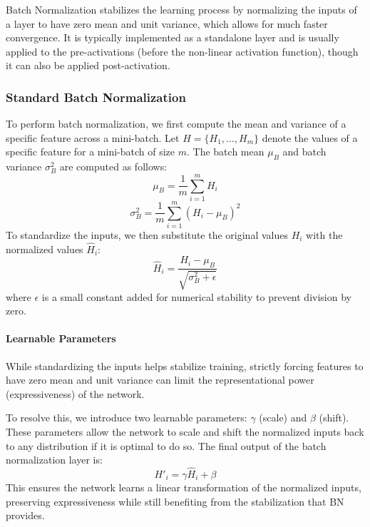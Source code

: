 Batch Normalization stabilizes the learning process by normalizing the inputs of a layer to have zero mean and unit variance, which allows for much faster convergence. 
It is typically implemented as a standalone layer and is usually applied to the pre-activations (before the non-linear activation function), though it can also be applied post-activation.

\subsubsection*{Standard Batch Normalization}
To perform batch normalization, we first compute the mean and variance of a specific feature across a mini-batch.
Let $H=\{H_1,\ldots,H_m\}$ denote the values of a specific feature for a mini-batch of size $m$. The batch mean $\mu_B$ and batch variance $\sigma_B^2$ are computed as follows:
\begin{equation*}
    \mu_B = \frac{1}{m} \sum_{i=1}^{m} H_i
\end{equation*}
\begin{equation*}
    \sigma_B^2 = \frac{1}{m} \sum_{i=1}^{m} (H_i - \mu_B)^2
\end{equation*}
To standardize the inputs, we then substitute the original values $H_i$ with the normalized values $\hat{H}_i$:
\begin{equation*}
    \hat{H}_i = \frac{H_i - \mu_B}{\sqrt{\sigma_B^2 + \epsilon}}
\end{equation*}
where $\epsilon$ is a small constant added for numerical stability to prevent division by zero.

\paragraph{Learnable Parameters}
While standardizing the inputs helps stabilize training, strictly forcing features to have zero mean and unit variance can limit the representational power (expressiveness) of the network.

To resolve this, we introduce two learnable parameters: $\gamma$ (scale) and $\beta$ (shift). 
These parameters allow the network to scale and shift the normalized inputs back to any distribution if it is optimal to do so. The final output of the batch normalization layer is:
\begin{equation*}
    H'_i = \gamma \hat{H}_i + \beta
\end{equation*}
This ensures the network learns a linear transformation of the normalized inputs, preserving expressiveness while still benefiting from the stabilization that BN provides.

